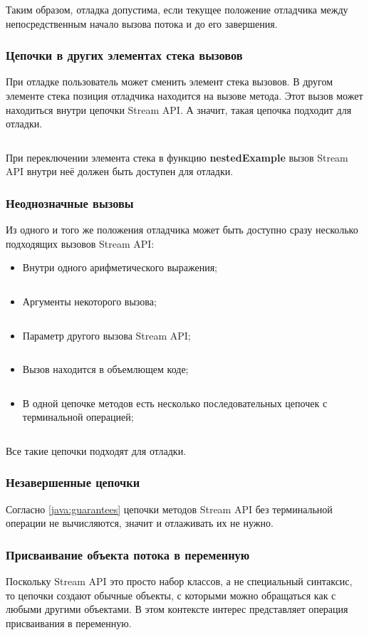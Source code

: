 Таким образом, отладка допустима, если текущее положение отладчика между непосредственным начало вызова потока и до его завершения.

\subsubsection{Цепочки в других элементах стека вызовов}
При отладке пользователь может сменить элемент стека вызовов. В другом элементе стека позиция отладчика находится на вызове метода. Этот вызов может находиться внутри цепочки Stream API. А значит, такая цепочка подходит для отладки.
\inputminted{java}{chapter2/code/NestedMethod.java}

При переключении элемента стека в функцию \textbf{nestedExample} вызов Stream API внутри неё должен быть доступен для отладки.

\subsubsection{Неоднозначные вызовы}
Из одного и того же положения отладчика может быть доступно сразу несколько подходящих вызовов Stream API:
\begin{itemize}
	\item Внутри одного арифметического выражения;
	\inputminted{java}{chapter2/code/AmbiguousPlus.java}
	\item Аргументы некоторого вызова;
	\inputminted{java}{chapter2/code/AmbiguousArgs.java}
	\item Параметр другого вызова Stream API;
	\inputminted{java}{chapter2/code/AmbiguousNested.java}
	\item Вызов находится в объемлющем коде;
	\inputminted{java}{chapter2/code/AmbiguousLambda.java}
	\item В одной цепочке методов есть несколько последовательных цепочек с терминальной операцией;
	\inputminted{java}{chapter2/code/AmbiguousLinkedChains.java}
\end{itemize}
Все такие цепочки подходят для отладки.

\subsubsection{Незавершенные цепочки}\label{java:incomplete}
Согласно \ref{java:guarantees} цепочки методов Stream API без терминальной операции не вычисляются, значит и отлаживать их не нужно.

\subsubsection{Присваивание объекта потока в переменную}
Поскольку Stream API это просто набор классов, а не специальный синтаксис, то цепочки создают обычные объекты, с которыми можно обращаться как с любыми другими объектами. В этом контексте интерес представляет операция присваивания в переменную.
\inputminted{java}{chapter2/code/AssignToVariable.java}

